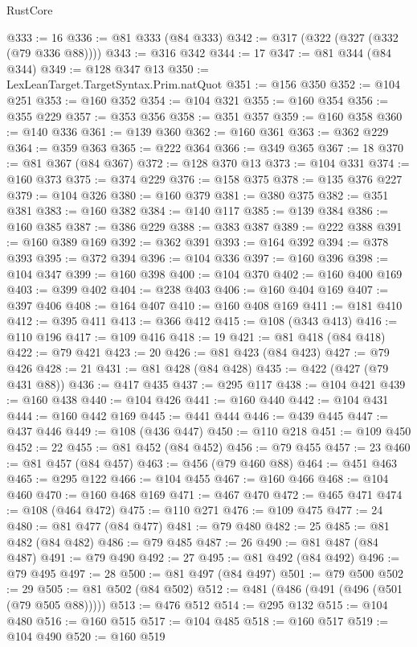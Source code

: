 \begin{lexlean}{RustCore}
\begin{coremodule}
@333 := 16
@336 := @81 @333 (@84 @333)
@342 := @317 (@322 (@327 (@332 (@79 @336 @88))))
@343 := @316 @342
@344 := 17
@347 := @81 @344 (@84 @344)
@349 := @128 @347 @13
@350 := LexLeanTarget.TargetSyntax.Prim.natQuot
@351 := @156 @350
@352 := @104 @251
@353 := @160 @352
@354 := @104 @321
@355 := @160 @354
@356 := @355 @229
@357 := @353 @356
@358 := @351 @357
@359 := @160 @358
@360 := @140 @336
@361 := @139 @360
@362 := @160 @361
@363 := @362 @229
@364 := @359 @363
@365 := @222 @364
@366 := @349 @365
@367 := 18
@370 := @81 @367 (@84 @367)
@372 := @128 @370 @13
@373 := @104 @331
@374 := @160 @373
@375 := @374 @229
@376 := @158 @375
@378 := @135 @376 @227
@379 := @104 @326
@380 := @160 @379
@381 := @380 @375
@382 := @351 @381
@383 := @160 @382
@384 := @140 @117
@385 := @139 @384
@386 := @160 @385
@387 := @386 @229
@388 := @383 @387
@389 := @222 @388
@391 := @160 @389 @169
@392 := @362 @391
@393 := @164 @392
@394 := @378 @393
@395 := @372 @394
@396 := @104 @336
@397 := @160 @396
@398 := @104 @347
@399 := @160 @398
@400 := @104 @370
@402 := @160 @400 @169
@403 := @399 @402
@404 := @238 @403
@406 := @160 @404 @169
@407 := @397 @406
@408 := @164 @407
@410 := @160 @408 @169
@411 := @181 @410
@412 := @395 @411
@413 := @366 @412
@415 := @108 (@343 @413)
@416 := @110 @196
@417 := @109 @416
@418 := 19
@421 := @81 @418 (@84 @418)
@422 := @79 @421
@423 := 20
@426 := @81 @423 (@84 @423)
@427 := @79 @426
@428 := 21
@431 := @81 @428 (@84 @428)
@435 := @422 (@427 (@79 @431 @88))
@436 := @417 @435
@437 := @295 @117
@438 := @104 @421
@439 := @160 @438
@440 := @104 @426
@441 := @160 @440
@442 := @104 @431
@444 := @160 @442 @169
@445 := @441 @444
@446 := @439 @445
@447 := @437 @446
@449 := @108 (@436 @447)
@450 := @110 @218
@451 := @109 @450
@452 := 22
@455 := @81 @452 (@84 @452)
@456 := @79 @455
@457 := 23
@460 := @81 @457 (@84 @457)
@463 := @456 (@79 @460 @88)
@464 := @451 @463
@465 := @295 @122
@466 := @104 @455
@467 := @160 @466
@468 := @104 @460
@470 := @160 @468 @169
@471 := @467 @470
@472 := @465 @471
@474 := @108 (@464 @472)
@475 := @110 @271
@476 := @109 @475
@477 := 24
@480 := @81 @477 (@84 @477)
@481 := @79 @480
@482 := 25
@485 := @81 @482 (@84 @482)
@486 := @79 @485
@487 := 26
@490 := @81 @487 (@84 @487)
@491 := @79 @490
@492 := 27
@495 := @81 @492 (@84 @492)
@496 := @79 @495
@497 := 28
@500 := @81 @497 (@84 @497)
@501 := @79 @500
@502 := 29
@505 := @81 @502 (@84 @502)
@512 := @481 (@486 (@491 (@496 (@501 (@79 @505 @88)))))
@513 := @476 @512
@514 := @295 @132
@515 := @104 @480
@516 := @160 @515
@517 := @104 @485
@518 := @160 @517
@519 := @104 @490
@520 := @160 @519

\end{coremodule}
\end{lexlean}
